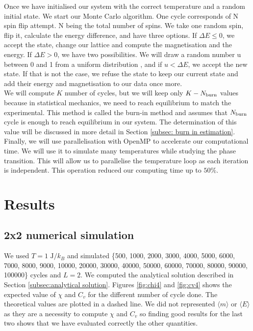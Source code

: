 \documentclass[english,notitlepage,reprint,nofootinbib]{revtex4-2}  %
\begin{document}
	Once we have initialised our system with the correct temperature and a random initial
	state. We start our Monte Carlo algorithm. One cycle corresponds of N spin flip attempt.
	N being the total number of spins. We take one random spin, flip it, calculate the
	energy difference, and have three options. If $\Delta E \le 0 $, we accept the state,
	change our lattice and compute the magnetisation and the energy. If $\Delta E > 0$, we have
	two possibilities. We will draw a random number u between 0 and 1 from a uniform distribution
	, and if $u < \Delta E$, we accept the new state. If that is not the case, we refuse the state to keep our current state and add their energy and magnetisation to our data once more. \\

	We will compute $K$ number of cycles, but we will keep only $K - N_{\rm burn}$ values
	because in statistical mechanics, we need to reach equilibrium to match the experimental.
	This method is called the burn-in method and assumes that $N_{\rm burn}$ cycle
	is enough to reach equilibrium in our system. The determination of this value will be
	discussed in more detail in Section \ref{subsec: burn in estimation}. \\

	Finally, we will use parallelisation with OpenMP to accelerate our computational time. We
	will use it to simulate many temperatures while studying the
	phase transition. This will allow us to parallelise the temperature loop as each iteration
	is independent. This operation reduced our computing time up to $50\%$.

	\section{Results}\label{sec:results}
	\subsection{2x2 numerical simulation}\label{subsec: 2x2 numerical}
	We used $T=1 \text{ J}/k_{B}$ and simulated \{500, 1000, 2000, 3000, 4000, 5000, 6000,
	7000, 8000, 9000, 10000, 20000, 30000, 40000, 50000, 60000, 70000, 80000, 90000, 100000\}
	cycles and $L=2$. We computed the analytical solution described in Section \ref{subsec:analytical solution}.
	Figures \ref{fig:chi4} and \ref{fig:cv4} shows the expected value of $\chi$ and $C_v$ for the different number of cycle done. The theoretical values are plotted in a dashed line. We did
	not represented $\langle m \rangle$ or $\langle E \rangle$ as they are a necessity to compute $\chi$ and $C_v$ so
	finding good results for the last two shows that we have evaluated correctly the other
	quantities.
\end{document}
